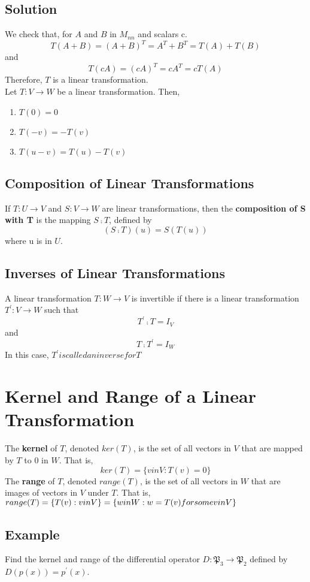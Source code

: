 \subsection*{Solution}
We check that, for $A$ and $B$ in $M_{nn}$ and scalars c.
$$T(A+B) = (A+B)^T = A^T + B^T = T(A) + T(B)$$and \qquad $$T(cA) = (cA)^T = cA^T = cT(A)$$ Therefore, $T$ is a linear transformation.\\
Let $T: V\rightarrow W$ be a linear transformation. Then, \begin{enumerate}
    \item $T(0) = 0$
    \item $T(-v) = -T(v)$
    \item $T(u-v) = T(u) - T(v)$
\end{enumerate}
\subsection*{Composition of Linear Transformations}
If $T: U\rightarrow V$ and $S: V\rightarrow W$ are linear transformations, then the \textbf{composition of S with T} is the mapping $S\comp T$, defined by 
$$(S\comp T)(u) = S(T(u))$$
where u is in $U$.
\subsection*{Inverses of Linear Transformations}
A linear transformation $T: W\rightarrow V$ is invertible if there is a linear transformation $T^\prime: V\rightarrow W$ such that
$$T^\prime\comp T = I_V$$ and $$T\comp T^\prime = I_W$$ In this case, $T^\prime is called an inverse for T$

\section{Kernel and Range of a Linear Transformation}
The \textbf{kernel} of $T$, denoted $ker(T)$, is the set of all vectors in $V$ that are mapped by $T$ to 0 in $W$. That is,
$$ker(T) = \{v in V: T(v) = 0\}$$
The \textbf{range} of $T$, denoted $range(T)$, is the set of all vectors in $W$ that are images of vectors in $V$ under $T$. That is, \\
$range(T) = \{T(v) : v in V\} \\=\{win W: w = T(v) for some v in V\}$\\

\subsection*{Example}
Find the kernel and range of the differential operator $D: \mathfrak{P}_3\rightarrow\mathfrak{P}_2$ defined by $D(p(x)) = p^\prime(x)$.
